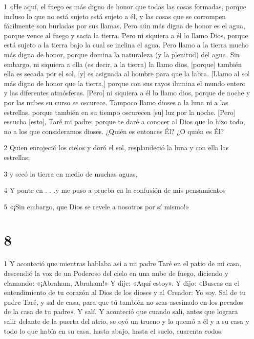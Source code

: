 \par 1 «He aquí, el fuego es más digno de honor que todas las cosas formadas, porque incluso lo que no está sujeto está sujeto a él, y las cosas que se corrompen fácilmente son burladas por sus llamas. Pero aún más digna de honor es el agua, porque vence al fuego y sacia la tierra. Pero ni siquiera a él lo llamo Dios, porque está sujeto a la tierra bajo la cual se inclina el agua. Pero llamo a la tierra mucho más digna de honor, porque domina la naturaleza (y la plenitud) del agua. Sin embargo, ni siquiera a ella (es decir, a la tierra) la llamo dios, [porque] también ella es secada por el sol, [y] es asignada al hombre para que la labra. [Llamo al sol más digno de honor que la tierra,] porque con sus rayos ilumina el mundo entero y las diferentes atmósferas. [Pero] ni siquiera a él lo llamo dios, porque de noche y por las nubes su curso se oscurece. Tampoco llamo dioses a la luna ni a las estrellas, porque también en su tiempo oscurecen [su] luz por la noche. [Pero] escucha [esto], Taré mi padre; porque te daré a conocer al Dios que lo hizo todo, no a los que consideramos dioses. ¿Quién es entonces Él? ¿O quién es Él?

\par 2 Quien enrojeció los cielos y doró el sol, resplandeció la luna y con ella las estrellas;

\par 3 y secó la tierra en medio de muchas aguas,

\par 4 Y ponte en . . .y me puso a prueba en la confusión de mis pensamientos

\par 5 «¡Sin embargo, que Dios se revele a nosotros por sí mismo!»

\chapter{8}

\par 1 Y aconteció que mientras hablaba así a mi padre Taré en el patio de mi casa, descendió la voz de un Poderoso del cielo en una nube de fuego, diciendo y clamando: «¡Abraham, Abraham!» Y dije: «Aquí estoy». Y dijo: «Buscas en el entendimiento de tu corazón al Dios de los dioses y al Creador: Yo soy. Sal de tu padre Taré, y sal de casa, para que tú también no seas asesinado en los pecados de la casa de tu padre». Y salí. Y aconteció que cuando salí, antes que lograra salir delante de la puerta del atrio, se oyó un trueno y lo quemó a él y a su casa y todo lo que había en su casa, hasta abajo, hasta el suelo, cuarenta codos.

